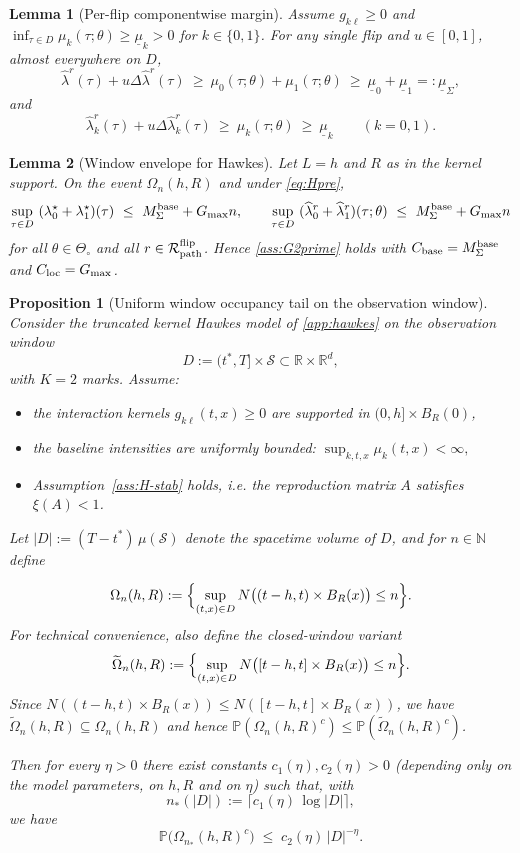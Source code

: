 \documentclass{statsoc}
\newtheorem{lemma}[lemma]{Lemma}
\newtheorem{proposition}[proposition]{Proposition}
\newcommand{\bbP}{\mathbb{P}}
\newcommand{\bbR}{\mathbb{R}}
\newcommand{\1}{\mathbbm{1}}
\newcommand{\bbN}{\mathbb{N}}
\begin{document}
\begin{lemma}[Per-flip componentwise margin]\label{lem:hawkes-margin}
Assume $g_{k\ell}\ge 0$ and $\inf_{\tau\in D}\mu_k(\tau;\theta)\ge \underline\mu_k>0$ for $k\in\{0,1\}$. For any single flip and $u\in[0,1]$, almost everywhere on $D$,
\[
\widehat\lambda^r(\tau)+u \Delta\widehat\lambda^r(\tau)\ \ge\ \mu_0(\tau;\theta)+\mu_1(\tau;\theta)\ \ge\ \underline\mu_0+\underline\mu_1=:\underline\mu_\Sigma,
\]
and
\[
\widehat\lambda_k^r(\tau)+u \Delta\widehat\lambda_k^r(\tau)\ \ge\ \mu_k(\tau;\theta)\ \ge\ \underline\mu_k\qquad (k=0,1).
\]
\end{lemma}

\begin{lemma}[Window envelope for Hawkes]\label{lem:hawkes-window}
Let $L=h$ and $R$ as in the kernel support. On the event $\Omega_{n}(h,R)$ and under \eqref{eq:Hpre},
\[
\sup_{\tau\in D}\ (\lambda_0^\star+\lambda_1^\star)(\tau)\ \le\ M_\Sigma^{\rm base}+G_{\max}n,\qquad
\sup_{\tau\in D}\ (\widehat\lambda_0^r+\widehat\lambda_1^r)(\tau;\theta)\ \le\ M_\Sigma^{\rm base}+G_{\max}n
\]
for all $\theta\in\Theta_\circ$ and all $r\in\mathcal R_{\rm path}^{\rm flip}$. Hence \cref{ass:G2prime} holds with $C_{\rm base}=M_\Sigma^{\rm base}$ and $C_{\rm loc}=G_{\max}$.
\end{lemma}

\begin{proposition}[Uniform window occupancy tail on the observation window]\label{prop:hawkes-tail}
Consider the truncated kernel Hawkes model of \cref{app:hawkes} on the observation window
\[
D := (t^\ast,T]\times\mathcal{S} \subset \bbR\times\bbR^d,
\]
with $K=2$ marks. Assume:
\begin{itemize}
    \item the interaction kernels $g_{k\ell}(t,x)\ge 0$ are supported in $(0,h]\times B_R(0)$,
    \item the baseline intensities are uniformly bounded:
    \(
      \sup_{k,t,x}\mu_k(t,x) < \infty,
    \)
    \item Assumption~\ref{ass:H-stab} holds, i.e. the reproduction matrix $A$ satisfies $\xi(A)<1$.
\end{itemize}
Let $|D|:=(T-t^\ast)\,\mu(\mathcal{S})$ denote the spacetime volume of $D$, and for $n\in\bbN$ define


\[
  \Omega_n(h,R)
  := \Bigl\{
      \sup_{(t,x)\in D}
      N\bigl((t-h,t)\times B_R(x)\bigr)\le n
    \Bigr\}.
\]
For technical convenience, also define the closed-window variant
\[
  \widetilde\Omega_n(h,R)
  := \Bigl\{
      \sup_{(t,x)\in D}
      N\bigl([t-h,t]\times B_R(x)\bigr)\le n
    \Bigr\}.
\]
Since \(N((t-h,t)\times B_R(x))\le N([t-h,t]\times B_R(x))\), we have \(\widetilde\Omega_n(h,R)\subseteq \Omega_n(h,R)\) and hence \(\bbP(\Omega_n(h,R)^c)\le \bbP(\widetilde\Omega_n(h,R)^c)\).

Then for every $\eta>0$ there exist constants $c_1(\eta),c_2(\eta)>0$ (depending only on the model parameters, on $h,R$ and on $\eta$) such that,
with
\[
  n_*(|D|) := \bigl\lceil c_1(\eta)\,\log|D| \bigr\rceil,
\]
we have
\[
  \bbP\bigl(\Omega_{n_*}(h,R)^c\bigr)
  \;\le\; c_2(\eta)\,|D|^{-\eta}.
\]
\end{proposition}
\end{document}
